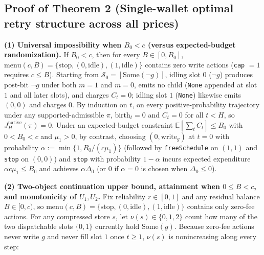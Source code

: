 \documentclass[11pt,a4paper]{article}
\begin{document}
\subsection{Proof of Theorem 2 (Single-wallet optimal retry structure
across all
prices)}\label{proof-of-theorem-2-single-wallet-optimal-retry-structure-across-all-prices}

\textbf{(1) Universal impossibility when \(B_0 < c\) (versus
expected-budget randomization).} If \(B_0 < c\), then for every
\(B \in [0, B_0]\),
\(\mathrm{menu}(c, B) = \{\mathrm{stop}, (0, \mathrm{idle}), (1, \mathrm{idle})\}\)
contains zero write actions (\texttt{cap} \(= 1\) requires \(c \le B\)).
Starting from \(\mathcal{S}_0 = [\mathrm{Some}(\neg g)]\), idling slot
\(0\) (\(\neg g\)) produces post-bit \(\neg g\) under both \(m = 1\) and
\(m = 0\), emits no child (\texttt{None} appended at slot \(1\) and all
later slots), and charges \(C_t = 0\); idling slot \(1\) (\texttt{None})
likewise emits \((0,0)\) and charges \(0\). By induction on \(t\), on
every positive-probability trajectory under any supported-admissible
\(\pi\), \(\mathrm{birth}_t = 0\) and \(C_t = 0\) for all \(t < H\), so
\(J_H^{\mathrm{native}}(\pi) = 0\). Under an expected-budget constraint
\(\mathbb{E}[\sum_t C_t] \le B_0\) with \(0 < B_0 < c\) and
\(\mu_1 > 0\), by contrast, choosing \((0, \mathrm{write}_g)\) at
\(t = 0\) with probability \(\alpha := \min\{1, B_0/(c\mu_1)\}\)
(followed by \texttt{freeSchedule} on \((1,1)\) and \texttt{stop} on
\((0,0)\)) and \texttt{stop} with probability \(1 - \alpha\) incurs
expected expenditure \(\alpha c \mu_1 \le B_0\) and achieves
\(\alpha \Delta_0\) (or \(0\) if \(\alpha = 0\) is chosen when
\(\Delta_0 \le 0\)).

\textbf{(2) Two-object continuation upper bound, attainment when
\(0 \le B < c\), and monotonicity of \(U_1, U_2\).} Fix reliability
\(r \in [0,1]\) and any residual balance \(B \in [0, c)\), so
\(\mathrm{menu}(c, B) = \{\mathrm{stop}, (0, \mathrm{idle}), (1, \mathrm{idle})\}\)
contains only zero-fee actions. For any compressed store \(s\), let
\(\nu(s) \in \{0, 1, 2\}\) count how many of the two dispatchable slots
\(\{0, 1\}\) currently hold \(\mathrm{Some}(g)\). Because zero-fee
actions never write \(g\) and never fill slot \(1\) once \(t \ge 1\),
\(\nu(s)\) is nonincreasing along every step:
\end{document}
